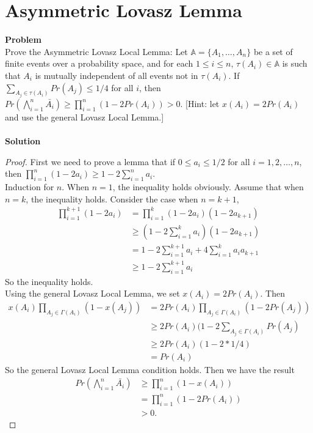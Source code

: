 	\section{Asymmetric Lovasz Lemma}
	\textbf{Problem}\\
	Prove the Asymmetric Lovasz Local Lemma: Let $\mathbb{A} = \{A_1, \dots, A_n\}$ be a set of finite events over a probability space, and for each $1 \le i \le n$, $\tau(A_i) \in \mathbb{A}$ is such that $A_i$ is mutually independent of all events not in $\tau(A_i)$. If $\sum_{A_j \in \tau(A_i)} Pr(A_j) \le 1/4 $ for all $i$, then $ Pr(\bigwedge_{i=1}^n \bar{A_i}) \ge \prod_{i=1}^n (1 - 2Pr(A_i))> 0$. [Hint: let $x(A_i) = 2Pr(A_i)$ and use the general Lovasz Local Lemma.]\\\\
	\textbf{Solution}\\
	\begin{proof}
		First we need to prove a lemma that if $0\le a_i \le 1/2$ for all $i=1,2,\dots,n$, then $\prod_{i=1}^n (1-2a_i) \ge 1-2\sum_{i=1}^n a_i$.\\
	Induction for $n$. When $n=1$, the inequality holds obviously. Assume that when $n=k$, the inequality holds. Consider the case when $n=k+1$,
	\begin{equation*}
		\begin{split}
			\prod_{i=1}^{k+1}(1-2a_i) &= \prod_{i=1}^k (1-2a_i) (1-2a_{k+1}) \\
			&\ge (1-2\sum_{i=1}^k a_i)(1-2a_{k+1})\\
			&= 1-2\sum_{i=1}^{k+1} a_i + 4\sum_{i=1}^k a_i a_{k+1}\\
			&\ge 1-2\sum_{i=1}^{k+1} a_i
		\end{split}
	\end{equation*}
	So the inequality holds.\\
	Using the general Lovasz Local Lemma, we set $x(A_i) = 2Pr(A_i)$. Then
	\begin{equation*}
		\begin{split}
			x(A_i)\prod_{A_j\in \Gamma(A_i)}(1-x(A_j)) &= 2Pr(A_i)\prod_{A_j\in \Gamma(A_i)}(1-2Pr(A_j))\\
			&\ge 2Pr(A_i) (1-2\sum_{A_j\in \Gamma(A_i)}Pr(A_j)\\
			&\ge 2Pr(A_i) (1 - 2 * 1/4)\\
			&= Pr(A_i)
		\end{split}
	\end{equation*}
	So the general Lovasz Local Lemma condition holds. Then we have the result
	\begin{equation*}
		\begin{split}
			Pr(\bigwedge_{i=1}^n \bar{A_i}) &\ge \prod_{i=1}^n (1 - x(A_i))\\
			&= \prod_{i=1}^n (1 - 2Pr(A_i))\\
			&> 0.
		\end{split}
	\end{equation*}
	\end{proof}
	
